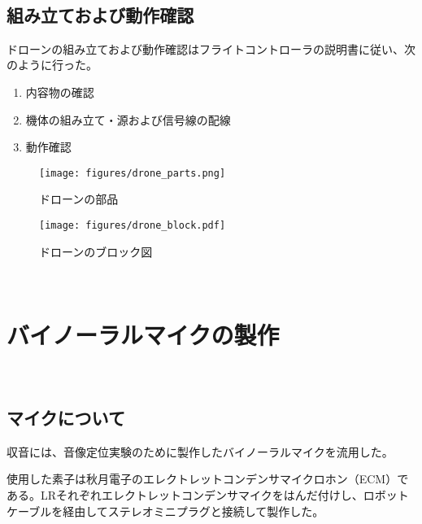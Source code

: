 \
\subsection{組み立ておよび動作確認}\label{assembly-drone}

ドローンの組み立ておよび動作確認はフライトコントローラの説明書\cite{quadrino_nano_instruction:online}に従い、次のように行った。

\begin{enumerate}
\renewcommand{\labelenumi}{(\arabic{enumi})}
\item
  内容物の確認
\item
  機体の組み立て・源および信号線の配線
\item
  動作確認
\end{enumerate}

\begin{figure}[H]
\centering
\texttt{[image: figures/drone\_parts.png]}
\caption{ドローンの部品}
\label{fig:drone_parts}
\end{figure}

\begin{figure}[H]
\centering
\texttt{[image: figures/drone\_block.pdf]}
\caption{ドローンのブロック図}
\label{fig:drone_parts}
\end{figure}

\
\section{バイノーラルマイクの製作}\label{binaural-mic}

\
\subsection{マイクについて}\label{about-mic}

収音には、音像定位実験のために製作したバイノーラルマイクを流用した。

使用した素子は秋月電子のエレクトレットコンデンサマイクロホン（ECM）である。LRそれぞれエレクトレットコンデンサマイクをはんだ付けし、ロボットケーブルを経由してステレオミニプラグと接続して製作した。

